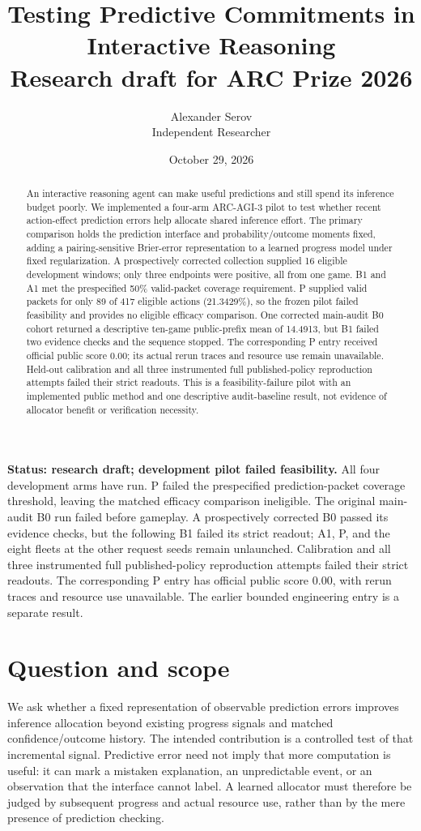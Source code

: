 \documentclass[11pt]{article}
\title{Testing Predictive Commitments in Interactive Reasoning\\\large Research draft for ARC Prize 2026}
\author{Alexander Serov\\Independent Researcher}
\date{October 29, 2026}
\begin{document}
\maketitle
\noindent\textbf{Status: research draft; development pilot failed feasibility.}
All four development arms have run. P failed the prespecified prediction-packet coverage threshold, leaving the matched efficacy comparison ineligible. The original main-audit B0 run failed before gameplay. A prospectively corrected B0 passed its evidence checks, but the following B1 failed its strict readout; A1, P, and the eight fleets at the other request seeds remain unlaunched. Calibration and all three instrumented full published-policy reproduction attempts failed their strict readouts. The corresponding P entry has official public score 0.00, with rerun traces and resource use unavailable. The earlier bounded engineering entry is a separate result.

\begin{abstract}
An interactive reasoning agent can make useful predictions and still spend its inference budget poorly. We implemented a four-arm ARC-AGI-3 pilot to test whether recent action-effect prediction errors help allocate shared inference effort. The primary comparison holds the prediction interface and probability/outcome moments fixed, adding a pairing-sensitive Brier-error representation to a learned progress model under fixed regularization. A prospectively corrected collection supplied 16 eligible development windows; only three endpoints were positive, all from one game. B1 and A1 met the prespecified 50\% valid-packet coverage requirement. P supplied valid packets for only 89 of 417 eligible actions (21.3429\%), so the frozen pilot failed feasibility and provides no eligible efficacy comparison. One corrected main-audit B0 cohort returned a descriptive ten-game public-prefix mean of 14.4913, but B1 failed two evidence checks and the sequence stopped. The corresponding P entry received official public score 0.00; its actual rerun traces and resource use remain unavailable. Held-out calibration and all three instrumented full published-policy reproduction attempts failed their strict readouts. This is a feasibility-failure pilot with an implemented public method and one descriptive audit-baseline result, not evidence of allocator benefit or verification necessity.
\end{abstract}

\section{Question and scope}
We ask whether a fixed representation of observable prediction errors improves inference allocation beyond existing progress signals and matched confidence/outcome history. The intended contribution is a controlled test of that incremental signal. Predictive error need not imply that more computation is useful: it can mark a mistaken explanation, an unpredictable event, or an observation that the interface cannot label. A learned allocator must therefore be judged by subsequent progress and actual resource use, rather than by the mere presence of prediction checking.
\end{document}
